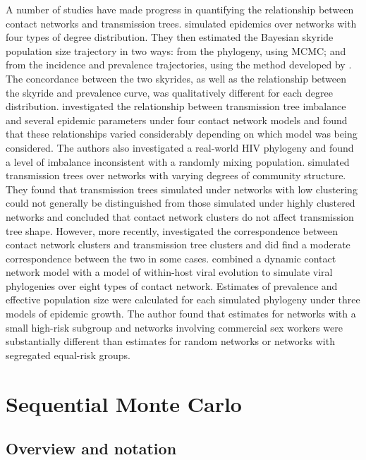 A number of studies have made progress in quantifying the relationship between
contact networks and transmission trees. \textcite{o2011contact} simulated
epidemics over networks with four types of degree distribution. They then
estimated the Bayesian skyride~\autocite{minin2008smooth} population size
trajectory in two ways: from the phylogeny, using \gls{MCMC}; and from the
incidence and prevalence trajectories, using the method developed by
\textcite{volz2009phylodynamics}. The concordance between the two skyrides, as
well as the relationship between the skyride and prevalence curve, was
qualitatively different for each degree distribution.
\textcite{leventhal2012inferring} investigated the relationship between
transmission tree imbalance and several epidemic parameters under four contact
network models and found that these relationships varied considerably
depending on which model was being considered. The authors also investigated a
real-world \gls{HIV} phylogeny and found a level of imbalance inconsistent with
a randomly mixing population. \textcite{welch2011network} simulated
transmission trees over networks with varying degrees of community structure.
They found that transmission trees simulated under networks with low clustering
could not generally be distinguished from those simulated under highly
clustered networks and concluded that contact network clusters do not affect
transmission tree shape. However, more recently,
\textcite{villandre2016assessment} investigated the correspondence between
contact network clusters and transmission tree clusters and did find a
moderate correspondence between the two in some cases.
\textcite{goodreau2006assessing} combined a dynamic contact network model with
a model of within-host viral evolution to simulate viral phylogenies over eight
types of contact network. Estimates of prevalence and effective population size
were calculated for each simulated phylogeny under three models of epidemic
growth. The author found that estimates for networks with a small high-risk
subgroup and networks involving commercial sex workers were substantially
different than estimates for random networks or networks with segregated
equal-risk groups.

\section{Sequential Monte Carlo}
\label{sec:smc}


\subsection{Overview and notation}

